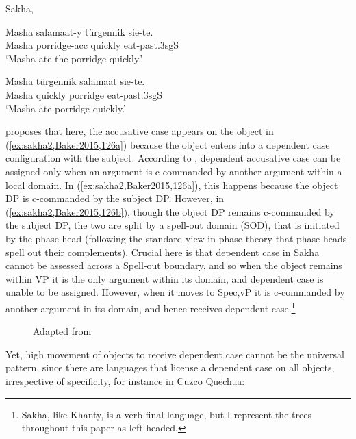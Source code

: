 \documentclass[output=paper
,modfonts
,nonflat]{langsci/langscibook}
\begin{document}
\begin{exe}
\ex Sakha, \citet[][126]{Baker2015} \label{ex:sakha2,Baker2015,1262}
\begin{xlist}
\ex
\gll Masha salamaat-y türgennik sie-te.\\
Masha porridge-{\sc acc} quickly eat-{\sc past.3sgS}\\
\glt `Masha ate the porridge quickly.' \label{ex:sakha2,Baker2015,126a}

\ex
\gll Masha türgennik salamaat sie-te.\\
Masha quickly porridge eat-{\sc past.3sgS}\\
\glt `Masha ate porridge quickly.'\label{ex:sakha2,Baker2015,126b}
\end{xlist}
\end{exe}


\noindent \citeauthor{Baker2015} proposes that here, the accusative case appears on the object in (\ref{ex:sakha2,Baker2015,126a}) because the object enters into a dependent case configuration with the subject. 
According to \citeauthor{Baker2015}, dependent accusative case can be assigned only when an argument is c-commanded by another argument within a local domain. 
In (\ref{ex:sakha2,Baker2015,126a}), this happens because the object DP is c-commanded by the subject DP. 
However, in (\ref{ex:sakha2,Baker2015,126b}), though the object DP remains c-commanded by the subject DP, the two are split by a spell-out domain (SOD), that is initiated by the phase head (following the standard view in phase theory that phase heads spell out their complements). 
Crucial here is that dependent case in Sakha cannot be assessed across a Spell-out boundary, and so when the object remains within VP it is the only argument within its domain, and dependent case is unable to be assigned. However, when it moves to Spec,vP it is c-commanded by another argument in its domain, and hence receives dependent case.\footnote{Sakha, like Khanty, is a verb final language, but I represent the trees throughout this paper as left-headed.}

\begin{figure}[!h]
\begin{exe}
\ex Adapted from \citet[][126]{Baker2015}\\
\end{exe} \vspace{-0.9cm}
\end{figure}
\newpage\noindent Yet, high movement of objects to receive dependent case cannot be the universal pattern, since there are languages that license a dependent case on all objects, irrespective of specificity, for instance in Cuzco Quechua:
\end{document}
